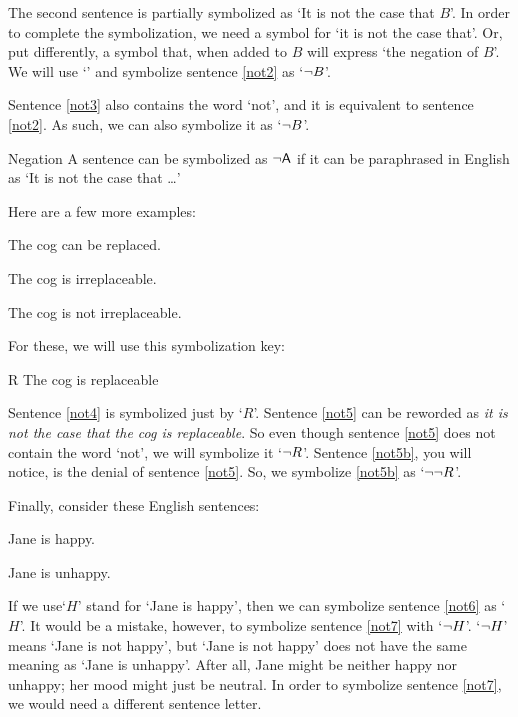 The second sentence is partially symbolized as `It is not the case that $B$'. In order to complete the symbolization, we need a symbol for `it is not the case that'. Or, put differently, a symbol that, when added to $B$ will express `the negation of $B$'. We will use `\enot' and symbolize sentence \ref{not2} as `${\neg} B$'.

Sentence \ref{not3} also contains the word `not', and it is equivalent to sentence \ref{not2}. As such, we can also symbolize it as `${\neg} B$'.

\begin{factboxy}{Negation}
A sentence can be symbolized as ${\neg}\mathsf{A}$ if it can be paraphrased in English as `It is not the case that \ldots'
\end{factboxy}

Here are a few more examples:
	\begin{earg}
		\item[\ex{not4}] The cog can be replaced.
		\item[\ex{not5}] The cog is irreplaceable.
		\item[\ex{not5b}] The cog is not irreplaceable.
	\end{earg}
For these, we will use this symbolization key:
	\begin{ekey}
		\item[R] The cog is replaceable
	\end{ekey}
Sentence \ref{not4} is symbolized just by `$R$'. Sentence \ref{not5} can be reworded as \textit{it is not the case that the cog is replaceable}. So even though sentence \ref{not5} does not contain the word `not', we will symbolize it `${\neg} R$'.
Sentence \ref{not5b}, you will notice, is the denial of sentence \ref{not5}. So, we symbolize \ref{not5b} as `${\neg}{\neg} R$'.

Finally, consider these English sentences:
	\begin{earg}
		\item[\ex{not6}] Jane is happy.
		\item[\ex{not7}] Jane is unhappy.
	\end{earg}
If we use`$H$' stand for `Jane is happy', then we can symbolize sentence \ref{not6} as `$H$'. It would be a mistake, however, to symbolize sentence \ref{not7} with `${\neg}{H}$'. 
`${\neg}{H}$' means `Jane is not happy', but `Jane is not happy' does not have the same meaning as `Jane is unhappy'. After all, Jane might be neither happy nor unhappy; her mood might just be neutral. In order to symbolize sentence \ref{not7}, we would need a different sentence letter.



